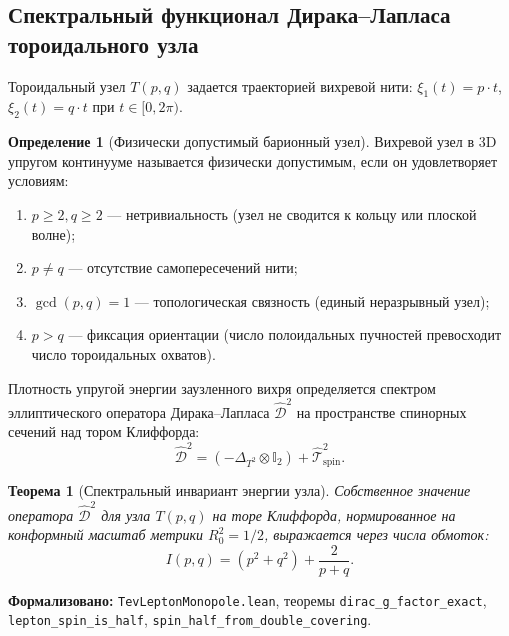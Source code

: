 \documentclass[11pt,a4paper]{article}
\newtheorem{theorem}{Теорема}
\theoremstyle{definition}
\newtheorem{definition}{Определение}
\theoremstyle{remark}
\begin{document}
\subsection{Спектральный функционал Дирака--Лапласа тороидального узла}
	
Тороидальный узел $T(p,q)$ задается траекторией вихревой нити: $\xi_1(t) = p \cdot t$, $\xi_2(t) = q \cdot t$ при $t \in [0, 2\pi)$.
	
\begin{definition}[Физически допустимый барионный узел]
Вихревой узел в 3D упругом континууме называется физически допустимым, если он удовлетворяет условиям:
\begin{enumerate}
	\item $p \ge 2, q \ge 2$ — нетривиальность (узел не сводится к кольцу или плоской волне);
	\item $p \ne q$ — отсутствие самопересечений нити;
	\item $\gcd(p, q) = 1$ — топологическая связность (единый неразрывный узел);
	\item $p > q$ — фиксация ориентации (число полоидальных пучностей превосходит число тороидальных охватов).
\end{enumerate}
\end{definition}
	
Плотность упругой энергии заузленного вихря определяется спектром эллиптического оператора Дирака--Лапласа $\hat{\mathcal{D}}^2$ на пространстве спинорных сечений над тором Клиффорда:
\begin{equation}
\hat{\mathcal{D}}^2 = \left( -\Delta_{T^2} \otimes \mathbb{I}_2 \right) + \hat{\mathcal{T}}_{\mathrm{spin}}^2.
\label{eq:dirac_laplace_operator_def}
\end{equation}
	
\begin{theorem}[Спектральный инвариант энергии узла]
\label{thm:knot_energy}
Собственное значение оператора $\hat{\mathcal{D}}^2$ для узла $T(p,q)$ на торе Клиффорда, нормированное на конформный масштаб метрики $R_0^2 = 1/2$, выражается через числа обмоток:
\begin{equation}
I(p, q) = (p^2 + q^2) + \frac{2}{p + q}.
\label{eq:knot_energy_invariant_formula}
\end{equation}
\end{theorem}

\noindent\small\textbf{Формализовано:} \texttt{TevLeptonMonopole.lean}, теоремы \texttt{dirac_g_factor_exact}, \texttt{lepton_spin_is_half}, \texttt{spin_half_from_double_covering}.
\end{document}
